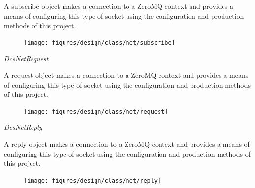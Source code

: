       \vspace*{-0.75cm}
      \begin{minipage}[t]{0.5\textwidth}
      	\vspace*{0.5cm}
        A subscribe object makes a connection to a ZeroMQ context and provides a
        means of configuring this type of socket using the configuration and
        production methods of this project.
      \end{minipage} \hfill
      \begin{minipage}[t]{0.45\textwidth}
        \begin{figure}[H]
          \texttt{[image: figures/design/class/net/subscribe]}
          \label{fig:dsg-classes-net-subscribe}
        \end{figure}
      \end{minipage}

      \emph{DcsNetRequest}

      \vspace*{-0.75cm}
      \begin{minipage}[t]{0.5\textwidth}
      	\vspace*{0.5cm}
        A request object makes a connection to a ZeroMQ context and provides a
        means of configuring this type of socket using the configuration and
        production methods of this project.
      \end{minipage} \hfill
      \begin{minipage}[t]{0.45\textwidth}
        \begin{figure}[H]
          \texttt{[image: figures/design/class/net/request]}
          \label{fig:dsg-classes-net-request}
        \end{figure}
      \end{minipage}

      \emph{DcsNetReply}

      \vspace*{-0.75cm}
      \begin{minipage}[t]{0.5\textwidth}
      	\vspace*{0.5cm}
        A reply object makes a connection to a ZeroMQ context and provides a
        means of configuring this type of socket using the configuration and
        production methods of this project.
      \end{minipage} \hfill
      \begin{minipage}[t]{0.45\textwidth}
        \begin{figure}[H]
          \texttt{[image: figures/design/class/net/reply]}
          \label{fig:dsg-classes-net-reply}
        \end{figure}
      \end{minipage}

